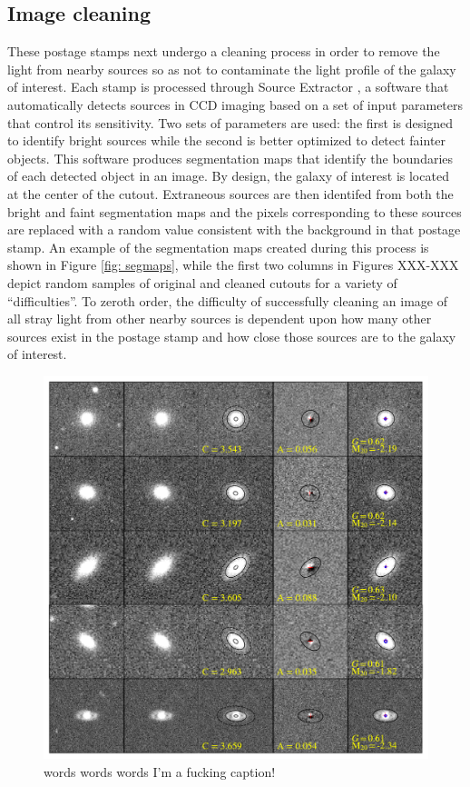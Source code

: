 \subsection{Image cleaning}
These postage stamps next undergo a cleaning process in order to remove the light from nearby sources so as not to contaminate the light profile of the galaxy of interest. Each stamp is processed through Source Extractor \citep[ver. 2.8.6;][]{sextractor}, a software that automatically detects sources in CCD imaging based on a set of input parameters that control its sensitivity. Two sets of parameters are used: the first is designed to identify bright sources while the second is better optimized to detect fainter objects. This software produces segmentation maps that identify the boundaries of each detected object in an image. By design, the galaxy of interest is located at the center of the cutout. Extraneous sources are then identifed from both the bright and faint segmentation maps and the pixels corresponding to these sources are replaced with a random value consistent with the background in that postage stamp.  An example of the segmentation maps created during this process is shown in Figure \ref{fig: segmaps}, while the first two columns in Figures XXX-XXX depict random samples of original and cleaned cutouts for a variety of ``difficulties''. To zeroth order, the difficulty of successfully cleaning an image of all stray light from other nearby sources is dependent upon how many other sources exist in the postage stamp and how close those sources are to the galaxy of interest. 


\begin{figure}
\includegraphics[width=\textwidth]{Figures/measure_morph_bin1.pdf}
\caption[Examples of image cleaning and morphology diagnostic measurements]{words words words I'm a fucking caption!}
\label{fig: clean examples}
\end{figure}

